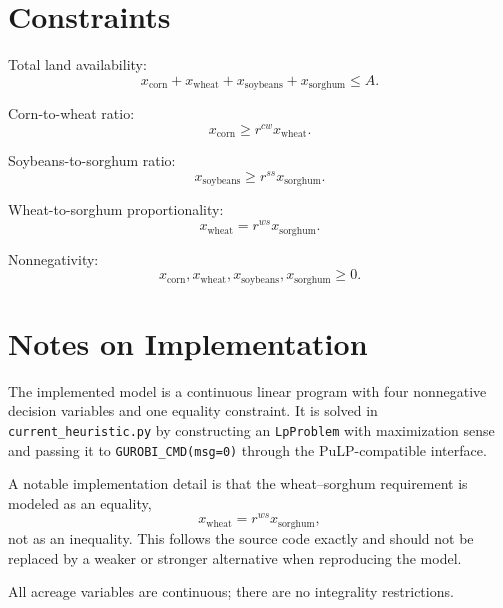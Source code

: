 \section*{Constraints}

Total land availability:
\[
x_{\text{corn}} + x_{\text{wheat}} + x_{\text{soybeans}} + x_{\text{sorghum}} \le A.
\]

Corn-to-wheat ratio:
\[
x_{\text{corn}} \ge r^{cw} x_{\text{wheat}}.
\]

Soybeans-to-sorghum ratio:
\[
x_{\text{soybeans}} \ge r^{ss} x_{\text{sorghum}}.
\]

Wheat-to-sorghum proportionality:
\[
x_{\text{wheat}} = r^{ws} x_{\text{sorghum}}.
\]

Nonnegativity:
\[
x_{\text{corn}},x_{\text{wheat}},x_{\text{soybeans}},x_{\text{sorghum}} \ge 0.
\]

\section*{Notes on Implementation}

The implemented model is a continuous linear program with four nonnegative decision variables and one equality constraint. It is solved in \texttt{current\_heuristic.py} by constructing an \texttt{LpProblem} with maximization sense and passing it to \texttt{GUROBI\_CMD(msg=0)} through the PuLP-compatible interface.

A notable implementation detail is that the wheat--sorghum requirement is modeled as an equality,
\[
x_{\text{wheat}} = r^{ws} x_{\text{sorghum}},
\]
not as an inequality. This follows the source code exactly and should not be replaced by a weaker or stronger alternative when reproducing the model.

All acreage variables are continuous; there are no integrality restrictions.
